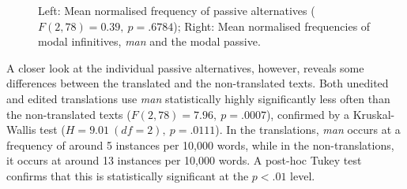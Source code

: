 \documentclass[output=paper]{LSP/langsci}
\begin{document}
\begin{figure}
  \begin{minipage}{0.5\textwidth}
  \end{minipage}%
  \begin{minipage}{0.5\textwidth}%
  \end{minipage}%
  \caption{Left: Mean normalised frequency of passive alternatives ($F(2,78)=0.39,~p=.6784$); Right: Mean normalised frequencies of modal infinitives, \emph{man} and the modal passive.}\label{bisiada:fig:passalt}
\end{figure}

\noindent A closer look at the individual passive alternatives, however, reveals some differences between the translated and the non-translated texts. Both unedited and edited translations use \emph{man} statistically highly significantly less often than the non-translated texts ($F(2,78)=7.96,~p=.0007$), confirmed by a Kruskal-Wallis test ($H=9.01~(df=2),~p=.0111$). In the translations, \emph{man} occurs at a frequency of around 5 instances per 10,000 words, while in the non-translations, it occurs at around 13 instances per 10,000 words. A post-hoc Tukey test confirms that this is statistically significant at the $p<.01$ level.
\end{document}
